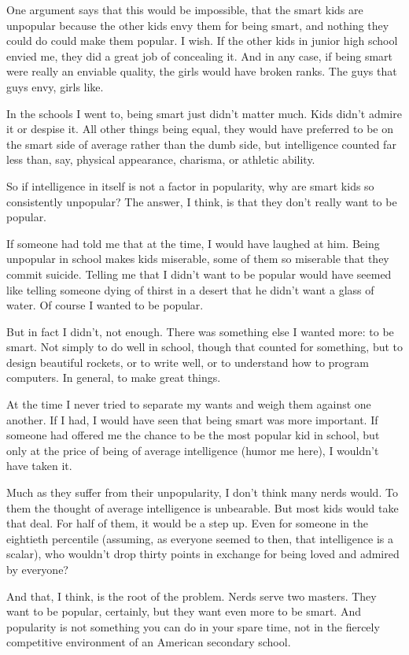 One argument says that this would be impossible, that the smart kids are
unpopular because the other kids envy them for being smart, and nothing
they could do could make them popular. I wish. If the other kids in
junior high school envied me, they did a great job of concealing it. And
in any case, if being smart were really an enviable quality, the girls
would have broken ranks. The guys that guys envy, girls like.

In the schools I went to, being smart just didn't matter much. Kids
didn't admire it or despise it. All other things being equal, they would
have preferred to be on the smart side of average rather than the dumb
side, but intelligence counted far less than, say, physical appearance,
charisma, or athletic ability.

So if intelligence in itself is not a factor in popularity, why are
smart kids so consistently unpopular? The answer, I think, is that they
don't really want to be popular.

If someone had told me that at the time, I would have laughed at him.
Being unpopular in school makes kids miserable, some of them so
miserable that they commit suicide. Telling me that I didn't want to be
popular would have seemed like telling someone dying of thirst in a
desert that he didn't want a glass of water. Of course I wanted to be
popular.

But in fact I didn't, not enough. There was something else I wanted
more: to be smart. Not simply to do well in school, though that counted
for something, but to design beautiful rockets, or to write well, or to
understand how to program computers. In general, to make great things.

At the time I never tried to separate my wants and weigh them against
one another. If I had, I would have seen that being smart was more
important. If someone had offered me the chance to be the most popular
kid in school, but only at the price of being of average intelligence
(humor me here), I wouldn't have taken it.

Much as they suffer from their unpopularity, I don't think many nerds
would. To them the thought of average intelligence is unbearable. But
most kids would take that deal. For half of them, it would be a step up.
Even for someone in the eightieth percentile (assuming, as everyone
seemed to then, that intelligence is a scalar), who wouldn't drop thirty
points in exchange for being loved and admired by everyone?

And that, I think, is the root of the problem. Nerds serve two masters.
They want to be popular, certainly, but they want even more to be smart.
And popularity is not something you can do in your spare time, not in
the fiercely competitive environment of an American secondary school.

